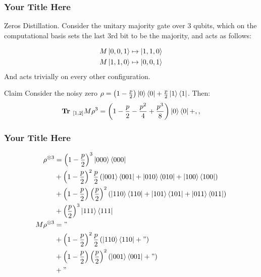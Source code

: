 \documentclass{beamer}
\begin{document}
\begin{frame}
  \frametitle{Your Title Here}

Zeros Distillation. Consider the unitary majority gate over $3$ qubits, which on the computational basis sets the last $3$rd bit to be the majority, and acts as follows:
  
  \begin{equation*}
    \begin{split}
      M \ket{0,0,1} & \mapsto \ket{1,1,0} \\ 
      M \ket{1,1,0} & \mapsto \ket{0,0,1} \\ 
    \end{split}
  \end{equation*} 
And acts trivially on every other configuration.

\begin{block}{Claim} Consider the noisy zero $\rho = \left( 1 - \frac{p}{2} \right) \ket{0}\bra{0} + \frac{p}{2}\ket{1}\bra{1}$. Then: 
  \begin{equation*}
    \begin{split}
      \textbf{Tr }_{[1,2]} M \rho^{3} = \left( 1 - \frac{p}{2} - \frac{p^2}{4} + \frac{p^3}{8} \right) \ket{0}\bra{0} + ,,
    \end{split}
  \end{equation*}
\end{block}
\end{frame}
\begin{frame}
  \frametitle{Your Title Here}

  
  \begin{equation*}
    \begin{split}
      \rho^{\otimes 3} &= \left( 1 - \frac{p}{2} \right)^3 \ket{000}\bra{000} \\ 
      &+ \left( 1 - \frac{p}{2} \right)^{2} \frac{p}{2}\left( \ket{001}\bra{001} + \ket{010}\bra{010} + \ket{100}\bra{100}  \right) \\
      &+ \left( 1 - \frac{p}{2} \right)\left(\frac{p}{2}\right)^2 \left( \ket{110}\bra{110} + \ket{101}\bra{101} + \ket{011}\bra{011} \right) \\ 
      &+ \left( \frac{p}{2} \right)^{3} \ket{111}\bra{111}\\
      M\rho^{\otimes 3} &= " \\
      &+ \left( 1 - \frac{p}{2} \right)^{2} \frac{p}{2}\left( \ket{110}\bra{110} + "  \right) \\
      &+ \left( 1 - \frac{p}{2} \right)\left(\frac{p}{2}\right)^2 \left( \ket{001}\bra{001} + " \right) \\ 
      &+ " 
    \end{split}
  \end{equation*}
\end{frame}
\end{document}
